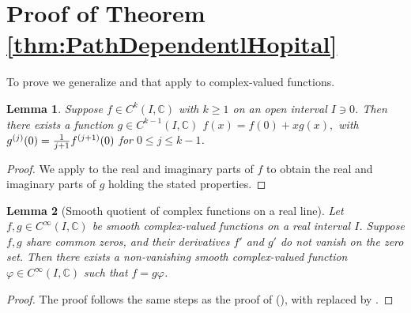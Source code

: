 \documentclass{article}
\newcommand{\Albert}[1]{{\color[rgb]{0.2,0.4,0.8}\textbf{Albert: } #1}}
\theoremstyle{theorem}
\newtheorem{lemma}{Lemma}
\theoremstyle{definition}
\def\CC{\mathbb{C}}
\begin{document}
\section{Proof of Theorem \ref{thm:PathDependentlHopital}}\label{app:proof_PathDependentlHopital}

To prove  we generalize  and  that apply to complex-valued functions.


\begin{lemma}
\label{lemma:ComplexWhitney}
    Suppose \(f\in C^k(I,\CC)\) with \(k\geq 1\) on an open interval \(I\ni 0\).  Then there exists a function \(g\in C^{k-1}(I,\CC)\)
    \(
        f(x) = f(0) + xg(x),
    \)     
    with \(g^{(j)}(0) = {1\over j+1}f^{(j+1)}(0)\) for \(0\leq j\leq k-1\).
\end{lemma}
\begin{proof}
We apply  to the real and imaginary parts of \(f\) to obtain the real and imaginary parts of \(g\) holding the stated properties.
\end{proof}

\begin{lemma}[Smooth quotient of complex functions on a real line]\label{lem:ComplexQuotient1D}
     Let \(f,g\in C^\infty(I,\CC)\) be smooth complex-valued functions on a real interval \(I\). Suppose \(f,g\) share common zeros, and their derivatives $f'$ and $g'$ do not vanish on the zero set. Then there exists a non-vanishing smooth complex-valued function \(\varphi\in C^\infty(I,\CC)\) such that \(f = g\varphi\).
\end{lemma}
\begin{proof}
    The proof follows the same steps as the proof of  (), with  replaced by .
\end{proof}
\end{document}
